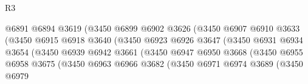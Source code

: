 \begin{lexlean}{R3}
\begin{coremodule}
                                          @6891
                                          @6894
                                          @3619
                                          (@3450
                                            @6899
                                            @6902
                                            @3626
                                            (@3450
                                              @6907
                                              @6910
                                              @3633
                                              (@3450
                                                @6915
                                                @6918
                                                @3640
                                                (@3450
                                                  @6923
                                                  @6926
                                                  @3647
                                                  (@3450
                                                    @6931
                                                    @6934
                                                    @3654
                                                    (@3450
                                                      @6939
                                                      @6942
                                                      @3661
                                                      (@3450
                                                        @6947
                                                        @6950
                                                        @3668
                                                        (@3450
                                                          @6955
                                                          @6958
                                                          @3675
                                                          (@3450
                                                            @6963
                                                            @6966
                                                            @3682
                                                            (@3450
                                                              @6971
                                                              @6974
                                                              @3689
                                                              (@3450
                                                                @6979

\end{coremodule}
\end{lexlean}
